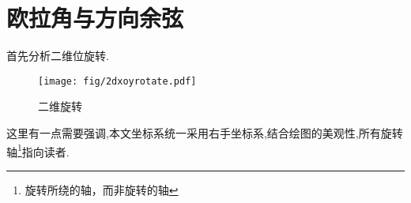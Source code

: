 \section{欧拉角与方向余弦}
首先分析二维位旋转.
\begin{figure}[!hbp]
    \begin{center}
        \texttt{[image: fig/2dxoyrotate.pdf]}
        \caption{二维旋转}\label{二维旋转}
    \end{center}
\end{figure}

这里有一点需要强调,本文坐标系统一采用右手坐标系,结合绘图的美观性,所有旋转轴\footnote{旋转所绕的轴，而非旋转的轴}指向读者.

